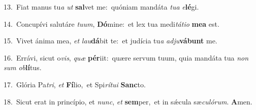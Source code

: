 {\numbfont\textcolor{\numbcolor}{13.}}~Fiat manus tu\textit{a} \textit{ut} \textbf{sal}\-vet me:~\star quóniam mandáta \textit{tu}\-\textit{a} \textit{e}\-\textbf{lé}gi.\par
{\numbfont\textcolor{\numbcolor}{14.}}~Concupívi salutáre \textit{tu}\-\textit{um}, \textbf{Dó}\-mine:~\star et lex tua medi\-\textit{tá}\-\textit{ti}\textit{o} \textbf{me}\-\textbf{a} est.\par
{\numbfont\textcolor{\numbcolor}{15.}}~Vivet ánima mea, \textit{et} \textit{lau}\-\textbf{dá}bit te:~\star et judícia tu\textit{a} \textit{ad}\-\textit{ju}\textbf{vá}\textbf{bunt} me.\par
{\numbfont\textcolor{\numbcolor}{16.}}~Errávi, sicut o\-\textit{vis}\-, \textit{quæ} \textbf{pér}\-iit:~\star quære servum tuum, quia mandáta tua \textit{non} \textit{sum} \textit{ob}\-\textbf{lí}tus.\par
{\numbfont\textcolor{\numbcolor}{17.}}~Glória Pa\-\textit{tri}\-, \textit{et} \textbf{Fí}\-lio,~\star et Spi\-\textit{rí}\-\textit{tu}\textit{i} \textbf{Sanc}\-to.\par
{\numbfont\textcolor{\numbcolor}{18.}}~Sicut erat in princípio, et \textit{nunc}\-, \textit{et} \textbf{sem}\-per,~\star et in sǽcula sæ\-\textit{cu}\-\textit{ló}\textit{rum}. \textbf{A}\-men.\par

